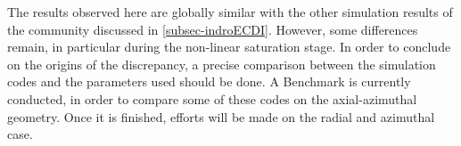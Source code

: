   
  The results observed here are globally similar with the other simulation results of the community discussed in \cref{subsec-indroECDI}.
  However, some differences remain, in particular during the non-linear saturation stage.
  In order to conclude on the origins of the discrepancy, a precise comparison between the simulation codes and the parameters used should be done.
  A Benchmark is currently conducted, in order to compare some of these codes on the axial-azimuthal geometry.
  Once it is finished, efforts will be made on the radial and azimuthal case.
  
  
